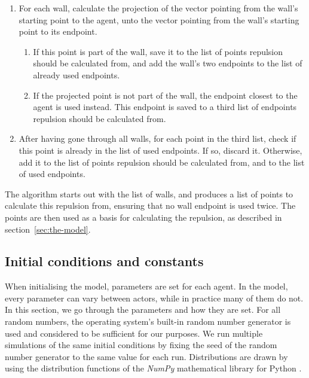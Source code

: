 \begin{enumerate}
    \item For each wall, calculate the projection of the vector pointing from 
        the wall's starting point to the agent, unto the vector pointing from 
        the wall's starting point to its endpoint.
        \begin{enumerate}
            \item If this point is part of the wall, save it to the list of points 
                repulsion should be calculated from, and add the wall's two endpoints 
                to the list of already used endpoints.

            \item If the projected point is not part of the wall, the endpoint closest 
                to the agent is used instead. This endpoint is saved to a 
                third list of endpoints repulsion should be calculated from.
        \end{enumerate}

    \item After having gone through all walls, for each point in the third 
        list, check if this point is already in the list of used endpoints. If 
        so, discard it. Otherwise, add it to the list of points repulsion 
        should be calculated from, and to the list of used endpoints.
\end{enumerate}

The algorithm starts out with the list of walls, and produces a list of points 
to calculate this repulsion from, ensuring that no wall endpoint is used 
twice. The points are then used as a basis for calculating the repulsion, as 
described in section~\ref{sec:the-model}.

\subsection{Initial conditions and constants}
\label{sec:init-cond}
When initialising the model, parameters are set for each agent. In the 
model, every parameter can vary between actors, while in practice many of them 
do not. In this section, we go through the parameters and how they are set.  
For all random numbers, the operating system's built-in random number 
generator is used and considered to be sufficient for our purposes. We run 
multiple simulations of the same initial conditions by fixing the seed of the 
random number generator to the same value for each run. Distributions are 
drawn by using the distribution functions of the \emph{NumPy} mathematical 
library for Python \cite{numpy}.

